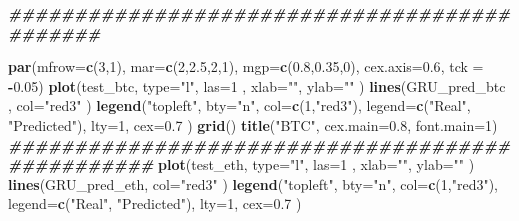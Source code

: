 \documentclass[
]{article}
\newenvironment{Shaded}{\begin{snugshade}}{\end{snugshade}}
\newcommand{\AttributeTok}[1]{\textcolor[rgb]{0.13,0.29,0.53}{#1}}
\newcommand{\DecValTok}[1]{\textcolor[rgb]{0.00,0.00,0.81}{#1}}
\newcommand{\DocumentationTok}[1]{\textcolor[rgb]{0.56,0.35,0.01}{\textbf{\textit{#1}}}}
\newcommand{\FloatTok}[1]{\textcolor[rgb]{0.00,0.00,0.81}{#1}}
\newcommand{\FunctionTok}[1]{\textcolor[rgb]{0.13,0.29,0.53}{\textbf{#1}}}
\newcommand{\NormalTok}[1]{#1}
\newcommand{\SpecialCharTok}[1]{\textcolor[rgb]{0.81,0.36,0.00}{\textbf{#1}}}
\newcommand{\StringTok}[1]{\textcolor[rgb]{0.31,0.60,0.02}{#1}}
\begin{document}
\begin{Shaded}
\begin{Highlighting}[]
\DocumentationTok{\#\#\#\#\#\#\#\#\#\#\#\#\#\#\#\#\#\#\#\#\#\#\#\#\#\#\#\#\#\#\#\#\#\#\#\#\#\#\#\#\#\#\#\#\#}

\FunctionTok{par}\NormalTok{(}\AttributeTok{mfrow=}\FunctionTok{c}\NormalTok{(}\DecValTok{3}\NormalTok{,}\DecValTok{1}\NormalTok{), }\AttributeTok{mar=}\FunctionTok{c}\NormalTok{(}\DecValTok{2}\NormalTok{,}\FloatTok{2.5}\NormalTok{,}\DecValTok{2}\NormalTok{,}\DecValTok{1}\NormalTok{), }\AttributeTok{mgp=}\FunctionTok{c}\NormalTok{(}\FloatTok{0.8}\NormalTok{,}\FloatTok{0.35}\NormalTok{,}\DecValTok{0}\NormalTok{), }\AttributeTok{cex.axis=}\FloatTok{0.6}\NormalTok{, }\AttributeTok{tck =} \SpecialCharTok{{-}}\FloatTok{0.05}\NormalTok{)}
\FunctionTok{plot}\NormalTok{(test\_btc, }\AttributeTok{type=}\StringTok{"l"}\NormalTok{, }\AttributeTok{las=}\DecValTok{1}\NormalTok{ , }\AttributeTok{xlab=}\StringTok{""}\NormalTok{, }\AttributeTok{ylab=}\StringTok{""}\NormalTok{ )}
\FunctionTok{lines}\NormalTok{(GRU\_pred\_btc , }\AttributeTok{col=}\StringTok{"red3"}\NormalTok{ )}
\FunctionTok{legend}\NormalTok{(}\StringTok{"topleft"}\NormalTok{, }\AttributeTok{bty=}\StringTok{"n"}\NormalTok{, }\AttributeTok{col=}\FunctionTok{c}\NormalTok{(}\DecValTok{1}\NormalTok{,}\StringTok{"red3"}\NormalTok{), }\AttributeTok{legend=}\FunctionTok{c}\NormalTok{(}\StringTok{"Real"}\NormalTok{, }\StringTok{"Predicted"}\NormalTok{), }\AttributeTok{lty=}\DecValTok{1}\NormalTok{, }\AttributeTok{cex=}\FloatTok{0.7}\NormalTok{ )}
\FunctionTok{grid}\NormalTok{()}
\FunctionTok{title}\NormalTok{(}\StringTok{"BTC"}\NormalTok{, }\AttributeTok{cex.main=}\FloatTok{0.8}\NormalTok{, }\AttributeTok{font.main=}\DecValTok{1}\NormalTok{)}
\DocumentationTok{\#\#\#\#\#\#\#\#\#\#\#\#\#\#\#\#\#\#\#\#\#\#\#\#\#\#\#\#\#\#\#\#\#\#\#\#\#\#\#\#\#\#\#\#\#\#\#\#\#}
\FunctionTok{plot}\NormalTok{(test\_eth, }\AttributeTok{type=}\StringTok{"l"}\NormalTok{, }\AttributeTok{las=}\DecValTok{1}\NormalTok{ , }\AttributeTok{xlab=}\StringTok{""}\NormalTok{, }\AttributeTok{ylab=}\StringTok{""}\NormalTok{ )}
\FunctionTok{lines}\NormalTok{(GRU\_pred\_eth, }\AttributeTok{col=}\StringTok{"red3"}\NormalTok{ )}
\FunctionTok{legend}\NormalTok{(}\StringTok{"topleft"}\NormalTok{, }\AttributeTok{bty=}\StringTok{"n"}\NormalTok{, }\AttributeTok{col=}\FunctionTok{c}\NormalTok{(}\DecValTok{1}\NormalTok{,}\StringTok{"red3"}\NormalTok{), }\AttributeTok{legend=}\FunctionTok{c}\NormalTok{(}\StringTok{"Real"}\NormalTok{, }\StringTok{"Predicted"}\NormalTok{), }\AttributeTok{lty=}\DecValTok{1}\NormalTok{, }\AttributeTok{cex=}\FloatTok{0.7}\NormalTok{ )}

\end{Highlighting}
\end{Shaded}
\end{document}
